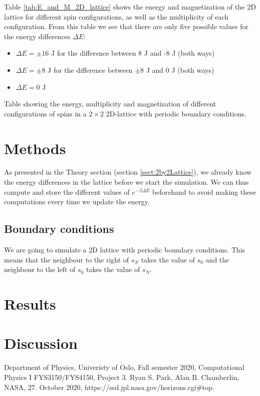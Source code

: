 \documentclass[reprint, english,notitlepage,nofootinbib]{revtex4-1}  %
\begin{document}
Table \ref{tab:E_and_M_2D_lattice} shows the energy and magnetization of the 2D lattice for different spin configurations, as well as the multiplicity of each configuration. From this table we see that there are only five possible values for the energy differences $\Delta E$:
\begin{itemize}
  \item $\Delta E = \pm 16$ J for the difference between 8 J and -8 J (both ways)
  \item $\Delta E = \pm 8$ J for the difference between $\pm 8$ J and 0 J (both ways)
  \item $\Delta E = 0$ J
\end{itemize}

\begin{table}
  
  \caption{Table showing the energy, multiplicity and magnetization of different configurations of spins in a $2 \times 2$ 2D-lattice with periodic boundary conditions.}
  \label{tab:E_and_M_2D_lattice}
\end{table}



\section{Methods}

As presented in the Theory section (section \ref{sect:2by2Lattice}), we already know the energy differences in the lattice before we start the simulation. We can thus compute and store the different values of $e^{- \beta \Delta E}$ beforehand to avoid making these computations every time we update the energy.


\subsection{Boundary conditions}

We are going to simulate a 2D lattice with periodic boundary conditions. This means that the neighbour to the right of $s_N$ takes the value of $s_0$ and the neighbour to the left of $s_0$ takes the value of $s_N$.



\section{Results}

\section{Discussion}

\onecolumngrid
\vspace{1cm} %

\begin{thebibliography}{}
 Department of Physics, Univeristy of Oslo, Fall semester 2020, Computational Physics I FYS3150/FYS4150, Project 3.
 Ryan S. Park, Alan B. Chamberlin, NASA, 27. October 2020, https://ssd.jpl.nasa.gov/horizons.cgi\#top.

\end{thebibliography}
\end{document}
